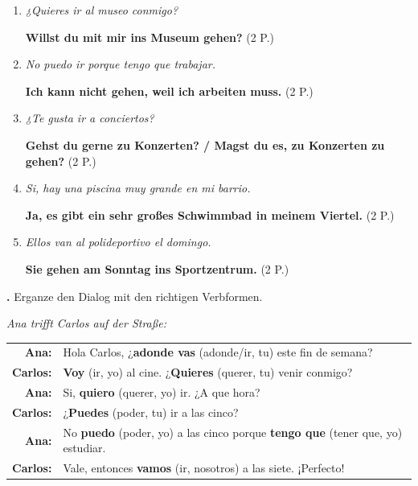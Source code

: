 \documentclass[11pt,a4paper]{article}
\newcommand{\lsg}[1]{\textcolor{loesung}{\textbf{#1}}}
\newcommand{\punktebox}[1]{\hfill\fbox{\small \_\_/#1}}
\newcommand{\es}[1]{\textit{#1}}
\newcounter{aufgabe}
\newcommand{\aufgabe}[2]{%
    \stepcounter{aufgabe}%
    \vspace{0.8em}%
    \noindent\textbf{\theaufgabe.} #1 \punktebox{#2}%
    \vspace{0.3em}%
}
\begin{document}
\begin{enumerate}[label=\alph*), leftmargin=2em, itemsep=0.6em]
    \item \es{¿Quieres ir al museo conmigo?}

    \lsg{Willst du mit mir ins Museum gehen?} \hfill \textcolor{grau}{(2 P.)}

    \item \es{No puedo ir porque tengo que trabajar.}

    \lsg{Ich kann nicht gehen, weil ich arbeiten muss.} \hfill \textcolor{grau}{(2 P.)}

    \item \es{¿Te gusta ir a conciertos?}

    \lsg{Gehst du gerne zu Konzerten? / Magst du es, zu Konzerten zu gehen?} \hfill \textcolor{grau}{(2 P.)}

    \item \es{Si, hay una piscina muy grande en mi barrio.}

    \lsg{Ja, es gibt ein sehr gro{\ss}es Schwimmbad in meinem Viertel.} \hfill \textcolor{grau}{(2 P.)}

    \item \es{Ellos van al polideportivo el domingo.}

    \lsg{Sie gehen am Sonntag ins Sportzentrum.} \hfill \textcolor{grau}{(2 P.)}
\end{enumerate}

\vspace{0.5em}

\aufgabe{Erganze den Dialog mit den richtigen Verbformen.}{8}

\vspace{0.3em}
\noindent\textit{Ana trifft Carlos auf der Stra{\ss}e:}

\vspace{0.2em}
\begin{tabularx}{\textwidth}{@{}rX@{}}
\textbf{Ana:} & Hola Carlos, ¿\lsg{adonde vas} (adonde/ir, tu) este fin de semana? \\[0.5em]
\textbf{Carlos:} & \lsg{Voy} (ir, yo) al cine. ¿\lsg{Quieres} (querer, tu) venir conmigo? \\[0.5em]
\textbf{Ana:} & Si, \lsg{quiero} (querer, yo) ir. ¿A que hora? \\[0.5em]
\textbf{Carlos:} & ¿\lsg{Puedes} (poder, tu) ir a las cinco? \\[0.5em]
\textbf{Ana:} & No \lsg{puedo} (poder, yo) a las cinco porque \lsg{tengo que} (tener que, yo) estudiar. \\[0.5em]
\textbf{Carlos:} & Vale, entonces \lsg{vamos} (ir, nosotros) a las siete. ¡Perfecto! \\
\end{tabularx}
\end{document}
